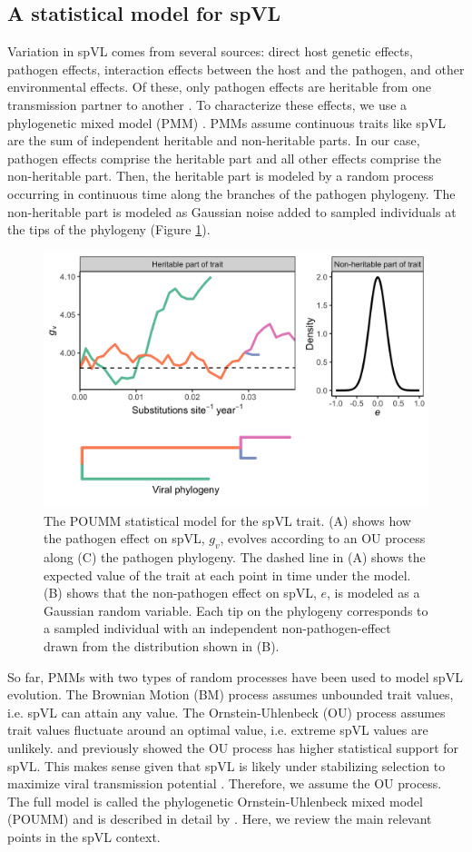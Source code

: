 \documentclass[]{article}
\begin{document}
\begin{doublespace}
\subsection{A statistical model for spVL}

Variation in spVL comes from several sources: direct host genetic effects, pathogen effects, interaction effects between the host and the pathogen, and other environmental effects. Of these, only pathogen effects are heritable from one transmission partner to another \citep{Leventhal2016}. To characterize these effects, we use a phylogenetic mixed model (PMM) \citep{Housworth2004}. PMMs assume continuous traits like spVL are the sum of independent heritable and non-heritable parts. In our case, pathogen effects comprise the heritable part and all other effects comprise the non-heritable part. Then, the heritable part is modeled by a random process occurring in continuous time along the branches of the pathogen phylogeny. The non-heritable part is modeled as Gaussian noise added to sampled individuals at the tips of the phylogeny (Figure \ref{fig:spVLModel}).

\begin{figure}[H]
	\begin{center}
		\includegraphics[width=0.462\linewidth]{figures/model_figure}
		\caption{The POUMM statistical model for the spVL trait. (A) shows how the pathogen effect on spVL, $g_v$, evolves according to an OU process along (C) the pathogen phylogeny. The dashed line in (A) shows the expected value of the trait at each point in time under the model. (B) shows that the non-pathogen effect on spVL, $e$, is modeled as a Gaussian random variable. Each tip on the phylogeny corresponds to a sampled individual with an independent non-pathogen-effect drawn from the distribution shown in (B).}
		\label{fig:spVLModel}
	\end{center}
\end{figure}

So far, PMMs with two types of random processes have been used to model spVL evolution. The Brownian Motion (BM) process assumes unbounded trait values, i.e. spVL can attain any value. The Ornstein-Uhlenbeck (OU) process assumes trait values fluctuate around an optimal value, i.e. extreme spVL values are unlikely. \citep{Mitov2018} and \citep{Bertels2018} previously showed the OU process has higher statistical support for spVL. This makes sense given that spVL is likely under stabilizing selection to maximize viral transmission potential \citep{Fraser2014}. Therefore, we assume the OU process. The full model is called the phylogenetic Ornstein-Uhlenbeck mixed model (POUMM) and is described in detail by \citet{Mitov2018}. Here, we review the main relevant points in the spVL context.


\end{doublespace}
\end{document}
